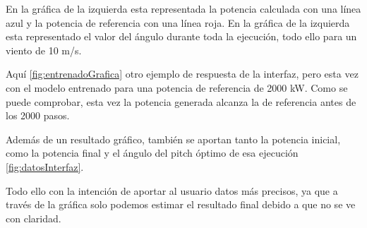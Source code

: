 \label{fig:ResultadoInterfaz}

En la gráfica de la izquierda esta representada la potencia calculada con una línea azul y la potencia de referencia con una línea roja. En la gráfica de la izquierda esta representado el valor del ángulo durante toda la ejecución, todo ello para un viento de 10 m/s.

\label{fig:entrenadoGrafica}

Aquí \ref{fig:entrenadoGrafica} otro ejemplo de respuesta de la interfaz, pero esta vez con el modelo entrenado para una potencia de referencia de 2000 kW. Como se puede comprobar, esta vez la potencia generada alcanza la de referencia antes de los 2000 pasos.

Además de un resultado gráfico, también se aportan tanto la potencia inicial, como la potencia final y el ángulo del pitch óptimo de esa ejecución \ref{fig:datosInterfaz}.

\label{fig:datosInterfaz}

Todo ello con la intención de aportar al usuario datos más precisos, ya que a través de la gráfica solo podemos estimar el resultado final debido a que no se ve con claridad.

